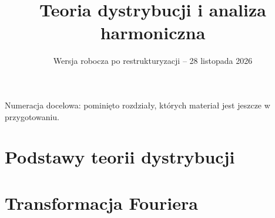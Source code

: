 \documentclass[11pt,a4paper]{article}
\title{Teoria dystrybucji i analiza harmoniczna}
\author{}
\date{Wersja robocza po restrukturyzacji -- 28 listopada 2026}
\numberwithin{equation}{section}
\theoremstyle{plain}
\theoremstyle{definition}
\theoremstyle{remark}
\begin{document}
\maketitle
\noindent Numeracja docelowa: pominięto rozdziały, których materiał jest jeszcze w przygotowaniu.\par
\tableofcontents
\clearpage
\setcounter{part}{0}
\part{Podstawy teorii dystrybucji}
\setcounter{section}{0}

\setcounter{section}{1}

\setcounter{section}{2}

\setcounter{section}{3}

\setcounter{section}{4}

\setcounter{section}{5}

\setcounter{section}{6}

\setcounter{section}{7}

\setcounter{part}{1}
\part{Transformacja Fouriera}
\setcounter{section}{8}

\setcounter{section}{9}

\setcounter{section}{10}

\setcounter{section}{11}

\setcounter{section}{12}

\setcounter{section}{13}

\setcounter{section}{14}

\setcounter{section}{15}

\setcounter{part}{2}
\end{document}
